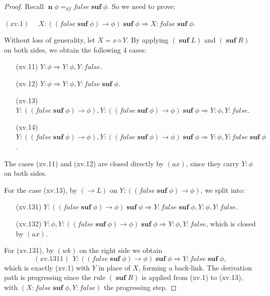 \documentclass[manuscript,screen]{acmart}
\newcommand{\dddef}[0]{=_{df}}
\newcommand{\false}[0]{\mathit{false}}
\newcommand{\cat}[0]{\diamond}
\DeclareMathOperator{\osuf}{\mathbf{suf}}
\DeclareMathOperator{\nxt}{\mathbf{n}}
\newcommand{\A}[1]{\mbox{ \textbf{#1} }}
\newcommand{\MO}{\A{MO}}
\begin{document}
\begin{proof}

Recall $\nxt\phi\dddef \false\osuf\phi$.
So we need to prove:
\begin{center}
$(xv.1)$ \ \ $X : ((\false\osuf\phi)\to \phi)\osuf\phi\Rightarrow X : \false\osuf\phi$.
\end{center}

Without loss of generality, let $X = x\cat Y$. 
By applying $(\osuf L)$ and $(\osuf R)$ on both sides, we obtain the following 4 cases:
\begin{enumerate}
    \item[(xv.11)] $Y : \phi\Rightarrow Y : \phi, Y : \false$. 
    \item[(xv.12)] $Y : \phi\Rightarrow Y : \phi, Y : \false\osuf\phi$. 
    \item[(xv.13)] $Y : ((\false\osuf\phi)\to \phi), Y : ((\false\osuf\phi)\to \phi)\osuf\phi\Rightarrow Y : \phi, Y : \false$. 
    \item[(xv.14)] $Y : ((\false\osuf\phi)\to \phi), Y : ((\false\osuf\phi)\to \phi)\osuf\phi\Rightarrow Y : \phi, Y : \false\osuf\phi$. 
\end{enumerate}
The cases (xv.11) and (xv.12) are closed directly by $(ax)$, since they carry $Y : \phi$ on both sides. 

For the case (xv.13), by $(\to L)$ on $Y : ((\false\osuf\phi)\to \phi)$, we split into:
\begin{enumerate}
    \item[(xv.131)] $Y : ((\false\osuf\phi)\to \phi)\osuf\phi\Rightarrow Y : \false\osuf\phi, Y : \phi, Y : \false$. 
    \item[(xv.132)] $Y : \phi, Y : ((\false\osuf\phi)\to \phi)\osuf\phi\Rightarrow Y : \phi, Y : \false$, which is closed by $(ax)$. 
\end{enumerate}
For (xv.131), by $(wk)$ on the right side we obtain
$$
(xv.1311)\ \ Y : ((\false\osuf\phi)\to \phi)\osuf\phi\Rightarrow Y : \false\osuf\phi, 
$$
which is exactly (xv.1) with $Y$ in place of $X$, forming a back-link. 
The derivation path is progressing since the rule $(\osuf R)$ is applied from (xv.1) to (xv.13), with $(X : \false\osuf\phi, Y : \false)$ the progressing step. 


\end{proof}
\end{document}
